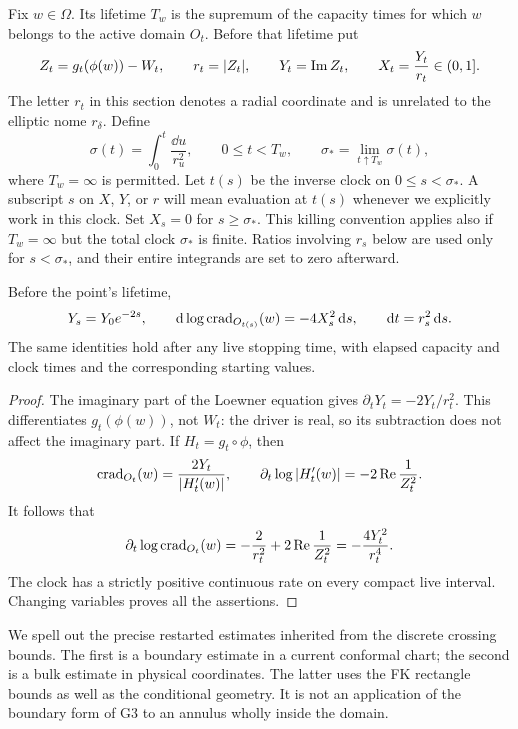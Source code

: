 Fix $w\in\Omega$.  Its lifetime $T_w$ is the supremum of the capacity times
for which $w$ belongs to the active domain $O_t$.  Before that lifetime put
\begin{equation}\label{eng:point-variables}
 Z_t=g_t(\phi(w))-W_t,\qquad
 r_t=|Z_t|,\qquad Y_t=\operatorname{Im} Z_t,\qquad X_t=\frac{Y_t}{r_t}\in(0,1].
\end{equation}
The letter $r_t$ in this section denotes a radial coordinate and is
unrelated to the elliptic nome $r_\delta$.
Define
\[
 \sigma(t)=\int_0^t\frac{\dd u}{r_u^2},\qquad 0\le t<T_w,
 \qquad
 \sigma_* =\lim_{t\uparrow T_w}\sigma(t),
\]
where $T_w=\infty$ is permitted.  Let $t(s)$ be the inverse clock on
$0\le s<\sigma_*$.  A subscript $s$ on $X$, $Y$, or $r$ will mean evaluation
at $t(s)$ whenever we explicitly work in this clock.  Set $X_s=0$ for
$s\ge\sigma_*$.  This killing convention applies also if $T_w=\infty$
but the total clock $\sigma_*$ is finite.  Ratios involving $r_s$ below are
used only for $s<\sigma_*$, and their entire integrands are set to zero
afterward.

\begin{lemma}\label{eng:clock}
Before the point's lifetime,
\begin{equation}\label{eng:clock-identities}
 Y_s=Y_0e^{-2s},\qquad
 \mathrm d\log\operatorname{crad}_{O_{t(s)}}(w)=-4X_s^2\,\mathrm d s,
 \qquad \mathrm d t=r_s^2\,\mathrm d s.
\end{equation}
The same identities hold after any live stopping time, with elapsed
capacity and clock times and the corresponding starting values.
\end{lemma}

\begin{proof}
The imaginary part of the Loewner equation gives
$\partial_tY_t=-2Y_t/r_t^2$.  This differentiates $g_t(\phi(w))$, not
$W_t$: the driver is real, so its subtraction does not affect the
imaginary part.  If $H_t=g_t\circ\phi$, then
\[
 \operatorname{crad}_{O_t}(w)=\frac{2Y_t}{|H_t'(w)|},\qquad
 \partial_t\log|H_t'(w)|=-2\operatorname{Re}\frac1{Z_t^2}.
\]
It follows that
\[
 \partial_t\log\operatorname{crad}_{O_t}(w)
 =-\frac2{r_t^2}+2\operatorname{Re}\frac1{Z_t^2}
 =-\frac{4Y_t^2}{r_t^4}.
\]
The clock has a strictly positive continuous rate on every compact live
interval.  Changing variables proves all the assertions.
\end{proof}

We spell out the precise restarted estimates inherited from the discrete
crossing bounds.  The first is a boundary estimate in a current conformal
chart; the second is a bulk estimate in physical coordinates.  The latter
uses the FK rectangle bounds as well as the conditional geometry.  It is
not an application of the boundary form of G3 to an annulus wholly inside
the domain.

